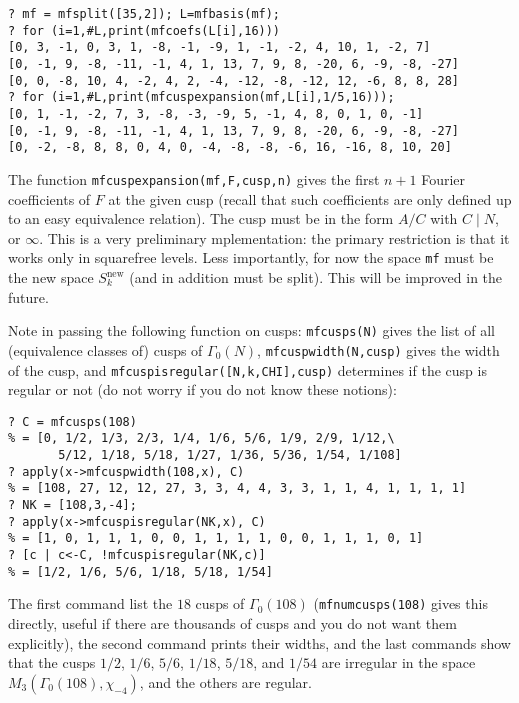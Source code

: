 \documentclass[11pt]{article}
\newcommand{\G}{\Gamma}
\newcommand{\new}{\text{new}}
\def\kbd#1{{\tt #1}}
\begin{document}
\medskip

\begin{verbatim}
? mf = mfsplit([35,2]); L=mfbasis(mf);
? for (i=1,#L,print(mfcoefs(L[i],16)))
[0, 3, -1, 0, 3, 1, -8, -1, -9, 1, -1, -2, 4, 10, 1, -2, 7]
[0, -1, 9, -8, -11, -1, 4, 1, 13, 7, 9, 8, -20, 6, -9, -8, -27]
[0, 0, -8, 10, 4, -2, 4, 2, -4, -12, -8, -12, 12, -6, 8, 8, 28]
? for (i=1,#L,print(mfcuspexpansion(mf,L[i],1/5,16)));
[0, 1, -1, -2, 7, 3, -8, -3, -9, 5, -1, 4, 8, 0, 1, 0, -1]
[0, -1, 9, -8, -11, -1, 4, 1, 13, 7, 9, 8, -20, 6, -9, -8, -27]
[0, -2, -8, 8, 8, 0, 4, 0, -4, -8, -8, -6, 16, -16, 8, 10, 20]
\end{verbatim}

The function \kbd{mfcuspexpansion(mf,F,cusp,n)} gives the first $n+1$
Fourier coefficients of $F$ at the given cusp (recall that such coefficients
are only defined up to an easy equivalence relation). The cusp must be
in the form $A/C$ with $C\mid N$, or $\infty$. This is a very preliminary
mplementation: the primary restriction is that it works only in squarefree
levels. Less importantly, for now the space \kbd{mf} must be the new space
$S_k^{\new}$ (and in addition must be split). This will be improved in the
future.

Note in passing the following function on cusps: \kbd{mfcusps(N)} gives
the list of all (equivalence classes of) cusps of $\G_0(N)$,
\kbd{mfcuspwidth(N,cusp)} gives the width of the cusp, and
\kbd{mfcuspisregular([N,k,CHI],cusp)} determines if the cusp is regular or
not (do not worry if you do not know these notions):

\begin{verbatim}
? C = mfcusps(108)
% = [0, 1/2, 1/3, 2/3, 1/4, 1/6, 5/6, 1/9, 2/9, 1/12,\
       5/12, 1/18, 5/18, 1/27, 1/36, 5/36, 1/54, 1/108]
? apply(x->mfcuspwidth(108,x), C)
% = [108, 27, 12, 12, 27, 3, 3, 4, 4, 3, 3, 1, 1, 4, 1, 1, 1, 1]
? NK = [108,3,-4];
? apply(x->mfcuspisregular(NK,x), C)
% = [1, 0, 1, 1, 1, 0, 0, 1, 1, 1, 1, 0, 0, 1, 1, 1, 0, 1]
? [c | c<-C, !mfcuspisregular(NK,c)]
% = [1/2, 1/6, 5/6, 1/18, 5/18, 1/54]
\end{verbatim}

The first command list the $18$ cusps of $\G_0(108)$ (\kbd{mfnumcusps(108)}
gives this directly, useful if there are thousands of cusps and you do not
want them explicitly), the second command prints their widths, and the last
commands show that the cusps $1/2$, $1/6$, $5/6$, $1/18$, $5/18$, and $1/54$
are irregular in the space $M_3(\G_0(108),\chi_{-4})$, and the others are
regular.
\end{document}
